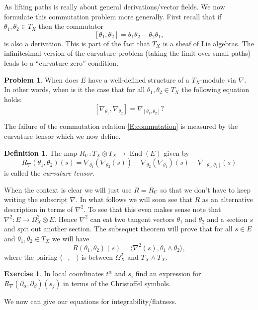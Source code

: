 \documentclass[12pt]{book}
\numberwithin{equation}{section}
\theoremstyle{definition}
\newtheorem{problem}[theorem]{Problem}
\newtheorem{definition}[theorem]{Definition}
\newtheorem{exercise}[theorem]{Exercise}
\theoremstyle{remark}
\newcommand{\End}{\operatorname{End}}
\begin{document}
As lifting paths is really about general derivations/vector fields.
We now formulate this commutation problem more generally.
First recall that if $\theta_1,\theta_2 \in T_X$ then the commutator
$$[\theta_1,\theta_2] = \theta_1 \theta_2 - \theta_2 \theta_1,$$
is also a derivation.
This is part of the fact that $T_X$ is a sheaf of Lie algebras.
The infinitesimal version of the curvature problem (taking the limit over small paths) leads to a ``curvature zero'' condition.
\begin{problem}
	When does $E$ have a well-defined structure of a $T_X$-module via $\nabla$. 
	In other words, when is it the case that for all $\theta_1,\theta_2 \in T_X$ the following equation holds:
	\begin{equation}\label{E:commutation}
	[\nabla_{\theta_1},\nabla_{\theta_2}] = \nabla_{[\theta_1,\theta_2]}?
	\end{equation}
\end{problem}

The failure of  the commutation relation \eqref{E:commutation} is measured by the curvature tensor which we now define.
\begin{definition}
	The map $R_{\nabla}:T_X\otimes T_X \to \End(E)$ given by 
	$$ R_{\nabla}(\theta_1,\theta_2)(s) = \nabla_{\theta_1}(\nabla_{\theta_2}(s)) - \nabla_{\theta_2}(\nabla_{\theta_1})(s) - \nabla_{[\theta_1,\theta_2]}(s) $$
	is called the \emph{curvature tensor}.
\end{definition}
When the context is clear we will just use $R=R_{\nabla}$ so that we don't have to keep writing the subscript $\nabla$.
In what follows we will soon see that $R$ as an alternative description in terms of  $\nabla^2$.
To see that this even makes sense note that $\nabla^2:E \to \Omega^2_X\otimes E$.
Hence $\nabla^2$ can eat two tangent vectors $\theta_1$ and $\theta_2$ and a section $s$ and spit out another section.
The subsequet theorem will prove that for all $s\in E$ and $\theta_1,\theta_2 \in T_X$ we will have 
$$ R(\theta_1,\theta_2)(s) = \langle \nabla^2(s), \theta_1 \wedge \theta_2 \rangle,$$
where the pairing $\langle -,-\rangle$ is between $\Omega_X^2$ and $T_X\wedge T_X$.

\begin{exercise}
	In local coordinates $t^{\alpha}$ and $s_i$ find an expression for $R_{\nabla}(\partial_{\alpha},\partial_{\beta})(s_j)$ in terms of the Christoffel symbols.
\end{exercise}

We now can give our equations for integrability/flatness.
\end{document}
